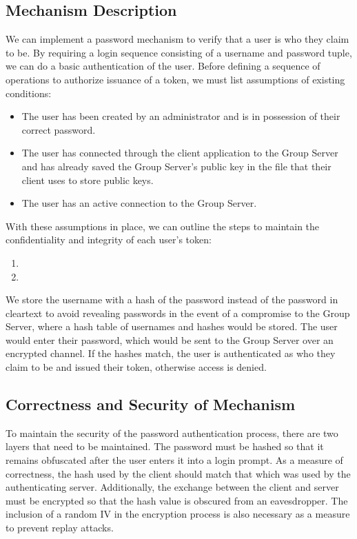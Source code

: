 \documentclass[11pt]{article}
\begin{document}
\subsection{Mechanism Description}
We can implement a password mechanism to verify that a user is who they claim to be. By requiring a login sequence consisting of a username and password tuple, we can do a basic authentication of the user. Before defining a sequence of operations to authorize issuance of a token, we must list assumptions of existing conditions:
\begin{itemize}
\item{}The user has been created by an administrator and is in possession of their correct password.
\item{}The user has connected through the client application to the Group Server and has already saved the Group Server's public key in the file that their client uses to store public keys.
\item{}The user has an active connection to the Group Server.
\end{itemize}
With these assumptions in place, we can outline the steps to maintain the confidentiality and integrity of each user's token:
\begin{enumerate}
\item{}
\item{}
\end{enumerate}
We store the username with a hash of the password instead of the password in cleartext to avoid revealing passwords in the event of a compromise to the Group Server, where a hash table of usernames and hashes would be stored. The user would enter their password, which would be sent to the Group Server over an encrypted channel. If the hashes match, the user is authenticated as who they claim to be and issued their token, otherwise access is denied.
\subsection{Correctness and Security of Mechanism}
To maintain the security of the password authentication process, there are two layers that need to be maintained. The password must be hashed so that it remains obfuscated after the user enters it into a login prompt. As a measure of correctness, the hash used by the client should match that which was used by the authenticating server. Additionally, the exchange between the client and server must be encrypted so that the hash value is obscured from an eavesdropper. The inclusion of a random IV in the encryption process is also necessary as a measure to prevent replay attacks.
\end{document}
